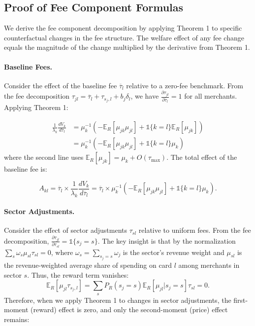 \documentclass[11pt,english]{article}
\theoremstyle{remark}
\begin{document}
\subsection{Proof of Fee Component Formulas}\label{subsec:fee-components}

We derive the fee component decomposition by applying Theorem 1 to specific counterfactual changes in the fee structure.
The welfare effect of any fee change equals the magnitude of the change multiplied by the derivative from Theorem 1.

\paragraph{Baseline Fees.}
Consider the effect of the baseline fee $\overline{\tau}_l$ relative to a zero-fee benchmark.
From the fee decomposition $\tau_{jl} = \overline{\tau}_l + \tau_{s_j,l} + b_j\delta_l$, we have $\frac{\partial \tau_{jl}}{\partial \overline{\tau}_l} = 1$ for all merchants.
Applying Theorem 1:

\begin{align*}
\frac{1}{\lambda_k}\frac{dV_k}{d\overline{\tau}_l}
&= \mu_k^{-1}\left( -\mathbb{E}_R[\mu_{jk}\mu_{jl}] + \mathbb{1}\{k=l\} \mathbb{E}_R[\mu_{jk}]\right) \\
&= \mu_k^{-1}\left( -\mathbb{E}_R[\mu_{jk}\mu_{jl}] + \mathbb{1}\{k=l\} \mu_k\right)
\end{align*}
where the second line uses $\mathbb{E}_R[\mu_{jk}] = \mu_k + O(\tau_{\max})$.
The total effect of the baseline fee is:

\[
A_{kl} = \overline{\tau}_l \times \frac{1}{\lambda_k}\frac{dV_k}{d\overline{\tau}_l} =\overline{\tau}_l \times \mu_k^{-1}\left(- \mathbb{E}_R[\mu_{jk}\mu_{jl}] + \mathbb{1}\{k=l\} \mu_k\right).
\]

\paragraph{Sector Adjustments.}
Consider the effect of sector adjustments $\tau_{sl}$ relative to uniform fees.
From the fee decomposition, $\frac{\partial \tau_{jl}}{\partial \tau_{sl}} = \mathbb{1}\{s_j = s\}$.
The key insight is that by the normalization $\sum_s \omega_{s} \mu_{sl} \tau_{sl} = 0$, where $\omega_{s} = \sum_{s_j = s} \omega_{j}$ is the sector's revenue weight and $\mu_{sl}$ is the revenue-weighted average share of spending on card $l$ among merchants in sector $s$. Thus, the reward term vanishes:
\[
\mathbb{E}_R[\mu_{jl} \tau_{s_j,l}] = \sum_s P_R(s_j=s) \mathbb{E}_R[\mu_{jl}|s_j=s] \tau_{sl} = 0.
\]
Therefore, when we apply Theorem 1 to changes in sector adjustments, the first-moment (reward) effect is zero, and only the second-moment (price) effect remains:
\end{document}
